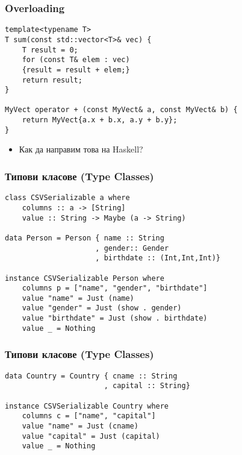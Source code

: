 \documentclass{beamer}
\begin{document}
\begin{frame}[fragile]
\frametitle{Overloading}

\begin{lstlisting}[basicstyle=\small]
template<typename T>
T sum(const std::vector<T>& vec) {
    T result = 0;
    for (const T& elem : vec) 
    {result = result + elem;}
    return result;
}

MyVect operator + (const MyVect& a, const MyVect& b) {
    return MyVect{a.x + b.x, a.y + b.y};
}
\end{lstlisting}

\begin{itemize}
  \item Как да направим това на Haskell?
\end{itemize}

\end{frame}


\begin{frame}[fragile]
\frametitle{Типови класове (Type Classes)}

\begin{lstlisting}[basicstyle=\small]
class CSVSerializable a where
    columns :: a -> [String]
    value :: String -> Maybe (a -> String)

data Person = Person { name :: String
                     , gender:: Gender
                     , birthdate :: (Int,Int,Int)}

instance CSVSerializable Person where
    columns p = ["name", "gender", "birthdate"]
    value "name" = Just (name)
    value "gender" = Just (show . gender)
    value "birthdate" = Just (show . birthdate)
    value _ = Nothing
  \end{lstlisting}


\end{frame}




\begin{frame}[fragile]
\frametitle{Типови класове (Type Classes)}

\begin{lstlisting}[basicstyle=\small]
data Country = Country { cname :: String
                       , capital :: String}

instance CSVSerializable Country where
    columns c = ["name", "capital"]
    value "name" = Just (cname)
    value "capital" = Just (capital)
    value _ = Nothing
\end{lstlisting}


\end{frame}
\end{document}
